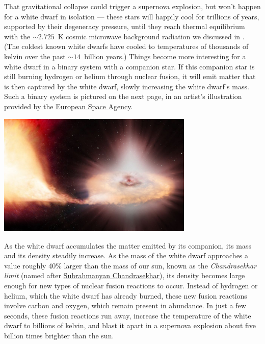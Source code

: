 That gravitational collapse could trigger a supernova explosion, but won't happen for a white dwarf in isolation --- these stars will happily cool for trillions of years, supported by their degeneracy pressure, until they reach thermal equilibrium with the $\sim$$2.725$~K cosmic microwave background radiation we discussed in .
(The coldest known white dwarfs have cooled to temperatures of thousands of kelvin over the past $\sim$$14$~billion years.)
Things become more interesting for a white dwarf in a binary system with a companion star.
If this companion star is still burning hydrogen or helium through nuclear fusion, it will emit matter that is then captured by the white dwarf, slowly increasing the white dwarf's mass.
Such a binary system is pictured on the next page, in an artist's illustration provided by the \href{https://www.esa.int/ESA_Multimedia/Images/2014/09/Artist_s_impression_of_Type_Ia_supernova}{European Space Agency}.

\begin{center}\includegraphics[width=0.7\textwidth]{figs/unit08_nova.pdf}\end{center}

As the white dwarf accumulates the matter emitted by its companion, its mass and its density steadily increase.
As the mass of the white dwarf approaches a value roughly 40\% larger than the mass of our sun, known as the \textit{Chandrasekhar limit} (named after \href{https://en.wikipedia.org/wiki/Subrahmanyan_Chandrasekhar}{Subrahmanyan Chandrasekhar}), its density becomes large enough for new types of nuclear fusion reactions to occur.
Instead of hydrogen or helium, which the white dwarf has already burned, these new fusion reactions involve carbon and oxygen, which remain present in abundance.
In just a few seconds, these fusion reactions run away, increase the temperature of the white dwarf to billions of kelvin, and blast it apart in a supernova explosion about five billion times brighter than the sun.

